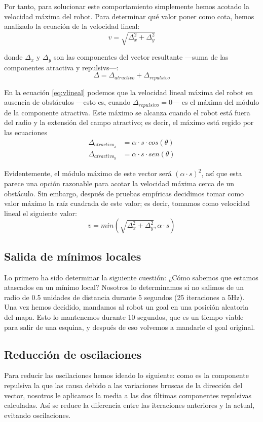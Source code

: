 \documentclass[a4paper, 11pt, titlepage]{article}
\begin{document}
    Por tanto, para solucionar este comportamiento simplemente hemos acotado la velocidad máxima del robot. Para determinar qué valor poner como cota, hemos analizado la ecuación de la velocidad lineal:
    \begin{equation}
        v = \sqrt{\Delta_x^2 + \Delta_y^2}
        \label{eq:vlineal}
    \end{equation}

    donde $\Delta_x$ y $\Delta_y$ son las componentes del vector resultante ---suma de las componentes atractiva y repulsivs---:
    \[
    \Delta = \Delta_{atractivo} + \Delta_{repulsivo}
    \]

    En la ecuación \ref{eq:vlineal} podemos que la velocidad lineal máxima del robot en ausencia de obstáculos ---esto es, cuando $\Delta_{repulsivo} = 0$--- es el máxima del módulo de la componente atractiva. Este máximo se alcanza cuando el robot está fuera del radio y la extensión del campo atractivo; es decir, el máximo está regido por las ecuaciones
    \begin{align*}
        \Delta_{atractivo_x} &= \alpha \cdot s \cdot cos(\theta) \\
        \Delta_{atractivo_y} &= \alpha \cdot s \cdot sen(\theta)
    \end{align*}

    Evidentemente, el módulo máximo de este vector será $(\alpha \cdot s)^2$, así que esta parece una opción razonable para acotar la velocidad máxima cerca de un obstáculo. Sin embargo, después de pruebas empíricas decidimos tomar como valor máximo la raíz cuadrada de este valor; es decir, tomamos como velocidad lineal el siguiente valor:
    \[
    v = min(\sqrt{\Delta_x^2 + \Delta_y^2}, \alpha \cdot s)
    \]


  \subsection{Salida de mínimos locales}
    Lo primero ha sido determinar la siguiente cuestión: ¿Cómo sabemos que estamos atascados en un mínimo local? Nosotros lo determinamos si no salimos de un radio de 0.5 unidades de distancia durante 5 segundos (25 iteraciones a 5Hz). Una vez hemos decidido, mandamos al robot un goal en una posición aleatoria del mapa. Esto lo mantenemos durante 10 segundos, que es un tiempo viable para salir de una esquina, y después de eso volvemos a mandarle el goal original.

  \subsection{Reducción de oscilaciones}
    Para reducir las oscilaciones hemos ideado lo siguiente: como es la componente repulsiva la que las causa debido a las variaciones bruscas de la dirección del vector, nosotros le aplicamos la media a las dos últimas componentes repulsivas calculadas. Así se reduce la diferencia entre las iteraciones anteriores y la actual, evitando oscilaciones.
\end{document}
